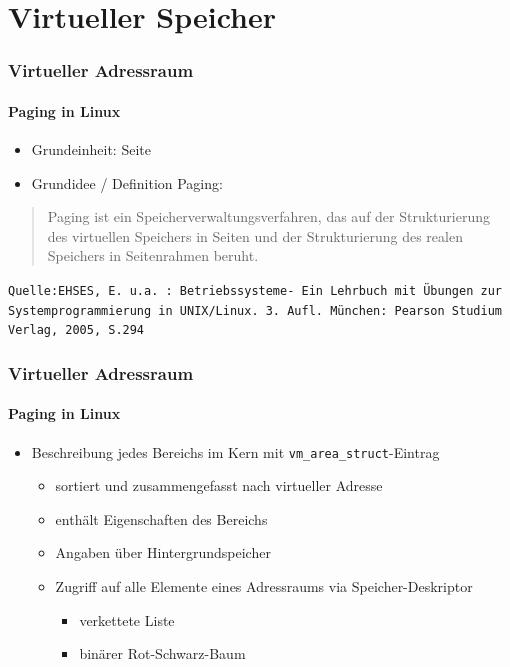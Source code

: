 \documentclass[ddcfooter,nosectionnum]{tudbeamer}
\begin{document}
\section{Virtueller Speicher}
\begin{frame}
    \frametitle{Virtueller Adressraum}
    \framesubtitle {Paging in Linux}
    \begin{itemize}
         \item Grundeinheit: Seite
         \item Grundidee / Definition Paging: 
          \end{itemize}
        \begin{quote}
        	\glqq Paging ist ein Speicherverwaltungsverfahren, das auf der Strukturierung  des virtuellen Speichers 	in Seiten und der Strukturierung des realen Speichers in Seitenrahmen beruht. \grqq
         \end{quote}
         \texttt{\tiny Quelle:EHSES, E. u.a. : Betriebssysteme- Ein Lehrbuch mit Übungen zur Systemprogrammierung in UNIX/Linux. 3. Aufl. München: Pearson Studium Verlag, 2005, S.294}
	    
\end{frame}


\begin{frame}
    \frametitle{Virtueller Adressraum}
    \framesubtitle {Paging in Linux}
    \begin{itemize}
    	    \item Beschreibung jedes Bereichs im Kern mit \texttt{vm\_area\_struct}-Eintrag 
   		\begin{itemize}
			\item sortiert und zusammengefasst nach virtueller Adresse\\
			\item enthält Eigenschaften des Bereichs
			\item Angaben über Hintergrundspeicher
    			\item Zugriff auf alle Elemente eines Adressraums via Speicher-Deskriptor
			\begin{itemize}
				\item verkettete Liste
				\item binärer Rot-Schwarz-Baum
			\end{itemize}
   		\end{itemize} 
	\end{itemize}
    
\end{frame}
\end{document}

